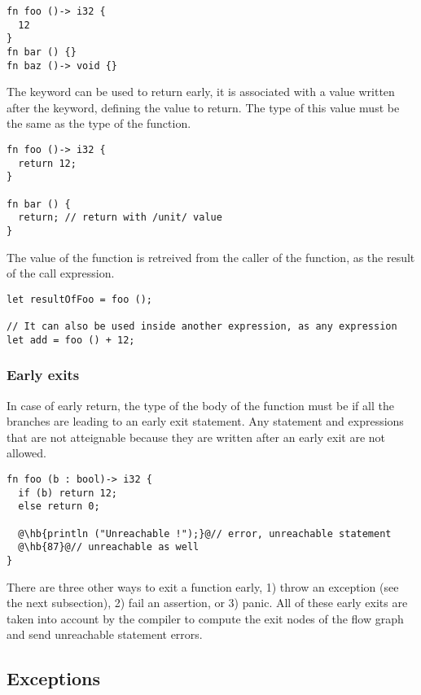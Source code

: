 \begin{lstlisting}[style=coloredverbatim]
fn foo ()-> i32 {
  12
}
fn bar () {}
fn baz ()-> void {}
\end{lstlisting}

The keyword  can be used to return early, it is associated with a
value written after the keyword, defining the value to return. The type of this
value must be the same as the type of the function.

\begin{lstlisting}[style=coloredverbatim]
fn foo ()-> i32 {
  return 12;
}

fn bar () {
  return; // return with /unit/ value
}
\end{lstlisting}

The value of the function is retreived from the caller of the function, as the
result of the call expression.

\begin{lstlisting}[style=coloredverbatim]
let resultOfFoo = foo ();

// It can also be used inside another expression, as any expression
let add = foo () + 12;
\end{lstlisting}

\subsubsection*{Early exits}
\label{sec:function_early_return}

In case of early return, the type of the body of the function must be
 if all the branches are leading to an early exit statement. Any
statement and expressions that are not atteignable because they are written
after an early exit are not allowed.

\begin{lstlisting}[style=coloredverbatim, escapechar=@]
fn foo (b : bool)-> i32 {
  if (b) return 12;
  else return 0;

  @\hb{println ("Unreachable !");}@// error, unreachable statement
  @\hb{87}@// unreachable as well
}
\end{lstlisting}

There are three other ways to exit a function early, 1) throw an exception (see
the next subsection), 2) fail an assertion, or 3) panic. All of these early
exits are taken into account by the compiler to compute the exit nodes of the
flow graph and send unreachable statement errors.

\subsection {Exceptions}

